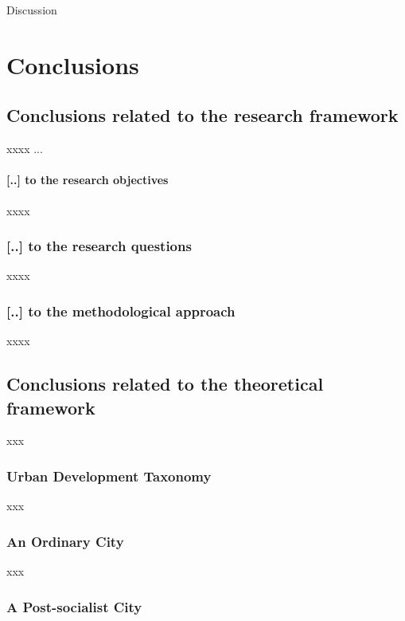 \documentclass[11pt]{report}
\begin{document}
Discussion


\chapter{Conclusions}


\section{Conclusions related to the research framework}

xxxx ...

\subsubsection{[..] to the research objectives}

xxxx

\subsection{[..] to the research questions}

xxxx

\subsection{[..] to the methodological approach}

xxxx

\section{Conclusions related to the theoretical framework}

xxx

\subsection{Urban Development Taxonomy}

xxx

\subsection{An Ordinary City}

xxx

\subsection{A Post-socialist City}
\end{document}
